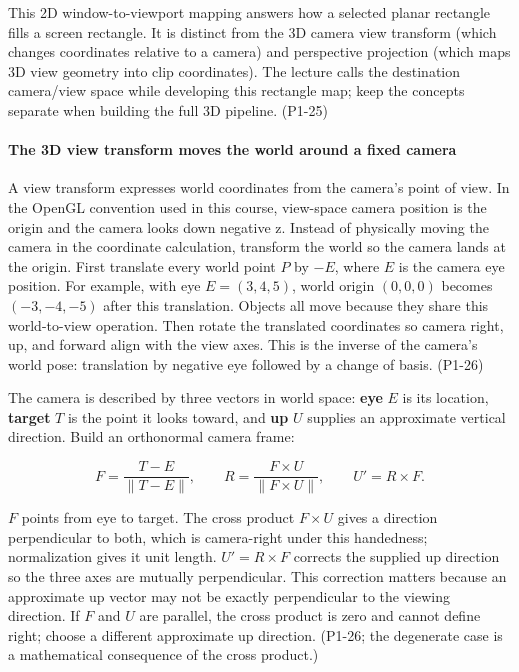 This 2D window-to-viewport mapping answers how a selected planar rectangle fills a screen rectangle. It is distinct from the 3D camera view transform (which changes coordinates relative to a camera) and perspective projection (which maps 3D view geometry into clip coordinates). The lecture calls the destination camera/view space while developing this rectangle map; keep the concepts separate when building the full 3D pipeline. (P1-25)

\paragraph{The 3D view transform moves the world around a fixed camera}\label{the-3d-view-transform-moves-the-world-around-a-fixed-camera}

A view transform expresses world coordinates from the camera's point of view. In the OpenGL convention used in this course, view-space camera position is the origin and the camera looks down negative z. Instead of physically moving the camera in the coordinate calculation, transform the world so the camera lands at the origin. First translate every world point \(P\) by \(-E\), where \(E\) is the camera eye position. For example, with eye \(E=(3,4,5)\), world origin \((0,0,0)\) becomes \((-3,-4,-5)\) after this translation. Objects all move because they share this world-to-view operation. Then rotate the translated coordinates so camera right, up, and forward align with the view axes. This is the inverse of the camera's world pose: translation by negative eye followed by a change of basis. (P1-26)

The camera is described by three vectors in world space: \textbf{eye} \(E\) is its location, \textbf{target} \(T\) is the point it looks toward, and \textbf{up} \(U\) supplies an approximate vertical direction. Build an orthonormal camera frame:

\[
F=\frac{T-E}{\|T-E\|},\qquad
R=\frac{F\times U}{\|F\times U\|},\qquad
U'=R\times F.
\]

\(F\) points from eye to target. The cross product \(F\times U\) gives a direction perpendicular to both, which is camera-right under this handedness; normalization gives it unit length. \(U'=R\times F\) corrects the supplied up direction so the three axes are mutually perpendicular. This correction matters because an approximate up vector may not be exactly perpendicular to the viewing direction. If \(F\) and \(U\) are parallel, the cross product is zero and cannot define right; choose a different approximate up direction. (P1-26; the degenerate case is a mathematical consequence of the cross product.)

